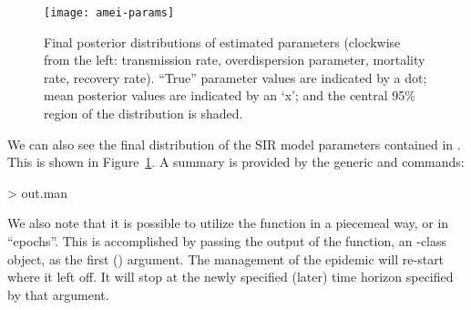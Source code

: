 \documentclass[shortnames,nojss]{jss}
\begin{document}
\begin{figure}[ht!]
\begin{Schunk}
\end{Schunk}
\centering \texttt{[image: amei-params]}
\caption{Final posterior distributions of estimated parameters 
(clockwise from the left: transmission rate, overdispersion parameter, 
mortality rate, recovery rate).  ``True'' parameter values are 
indicated by a dot; mean posterior values are indicated by an `x'; 
and the central 95\% region of the distribution is shaded.}
\label{f:params} 
\end{figure} 
We can also see the final distribution of the SIR model parameters
contained in .
This is shown in Figure~\ref{f:params}.  A summary is provided by
the generic  and  commands:
\begin{Schunk}
\begin{Sinput}
> out.man
\end{Sinput}
\end{Schunk}

We also note that it is possible to utilize the  function
in a piecemeal way, or in ``epochs''.  This is accomplished by passing
the output of the  function, an -class
object, as the first () argument.  The management of the
epidemic will re-start where it left off.  It will stop at the newly
specified (later) time horizon  specified by that argument.
\end{document}

